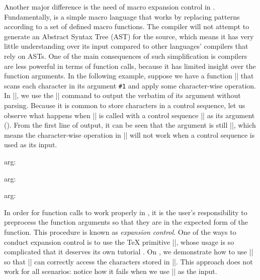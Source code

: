 \documentclass{ltugboat}
\begin{document}
Another major difference is the need of macro expansion control in \LT{}.
Fundamentally, \LT{} is a simple macro language that works by replacing patterns according to a set of defined macro functions.
The \LT{} compiler will not attempt to generate an Abstract Syntax Tree (AST) for the \LT{} source, which means it has very little understanding over its input compared to other languages' compilers that rely on ASTs.
One of the main consequences of such simplification is \LT{} compilers are less powerful in terms of function calls, because it has limited insight over the function arguments.
In the following example, suppose we have a function \inltex|\cmda| that scans each character in its argument \verb|#1| and apply some character-wise operation. 
In \inltex|\cmda|, we use the \inltex|\detokenize| command to output the verbatim of its argument without parsing.
Because it is common to store characters in a control sequence, let us observe what happens when \inltex|\cmda| is called with a control sequence \inltex|\vala| as its argument ().
From the first line of output, it can be seen that the argument is still \inltex|\vala|, which means the character-wise operation in \inltex|\cmda| will not work when a control sequence is used as its input.
\begin{latexsample}[examplelabel=ex:trad-expan-ctrl,exampletitle={Expansion Control}]
\def\cmda#1{%
  arg: \detokenize{#1} %
}
\def\vala{val-a}
\def\valb{\vala}
\par\cmda{\vala}
\par\expandafter\expandafter\expandafter\cmda\expandafter{\vala}
\par\expandafter\expandafter\expandafter\cmda\expandafter{\valb}
\end{latexsample}
\noindent In order for function calls to work properly in \LT{}, it is the user's responsibility to preprocess the function arguments so that they are in the expected form of the function.
This procedure is known as \emph{expansion control}.
One of the ways to conduct expansion control is to use the \TeX{} primitive \inltex|\expandafter|, whose usage is so complicated that it deserves its own tutorial \cite{bechtolsheim1988tutorial}.
On , we demonstrate how to use \inltex|\expandafter| so that \inltex|\cmda| can correctly access the characters stored in \inltex|\vala|.
This approach does not work for all scenarios: notice how it fails when we use \inltex|\valb| as the input.
\end{document}
